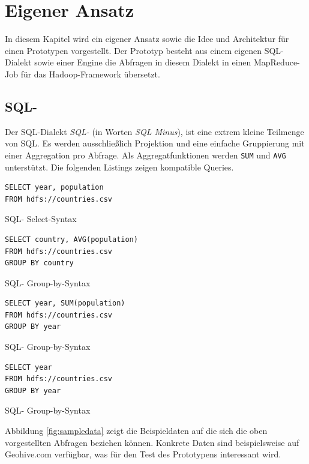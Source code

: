 \documentclass[a4paper]{article}
\begin{document}
\newpage
\section{Eigener Ansatz}
In diesem Kapitel wird ein eigener Ansatz sowie die Idee und Architektur für einen Prototypen vorgestellt. Der Prototyp besteht aus einem eigenen SQL-Dialekt sowie einer Engine die Abfragen in diesem Dialekt in einen MapReduce-Job für das Hadoop-Framework übersetzt.

\subsection{SQL-}
Der SQL-Dialekt \textit{SQL-} (in Worten \textit{SQL Minus}), ist eine extrem kleine Teilmenge von SQL. Es werden ausschließlich Projektion und eine einfache Gruppierung mit einer Aggregation pro Abfrage. Als Aggregatfunktionen werden \texttt{SUM} und \texttt{AVG} unterstützt. Die folgenden Listings zeigen kompatible Queries. 

\begin{listing}[H]
\begin{verbatim}
SELECT year, population
FROM hdfs://countries.csv
\end{verbatim}
\caption{SQL- Select-Syntax}
\end{listing}

\begin{listing}[H]
\begin{verbatim}
SELECT country, AVG(population)
FROM hdfs://countries.csv
GROUP BY country
\end{verbatim}
\caption{SQL- Group-by-Syntax}
\end{listing}

\begin{listing}[H]
\begin{verbatim}
SELECT year, SUM(population)
FROM hdfs://countries.csv
GROUP BY year
\end{verbatim}
\caption{SQL- Group-by-Syntax}
\end{listing}

\begin{listing}[H]
\begin{verbatim}
SELECT year
FROM hdfs://countries.csv
GROUP BY year
\end{verbatim}
\caption{SQL- Group-by-Syntax}
\end{listing}

Abbildung \ref{fig:sampledata} zeigt die Beispieldaten auf die sich die oben vorgestellten Abfragen beziehen können. Konkrete Daten sind beispielsweise auf Geohive.com \cite{GeoHive} verfügbar, was für den Test des Prototypens interessant wird.
\end{document}
